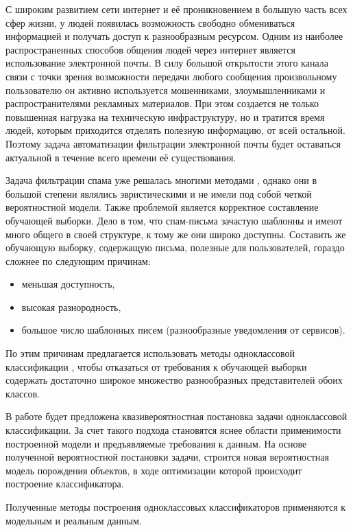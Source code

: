 С широким развитием сети интернет и её проникновением в большую часть всех сфер жизни, у людей появилась возможность свободно обмениваться информацией и получать доступ к разнообразным ресурсом. 
Одним из наиболее распространенных способов общения людей через интернет является использование электронной почты. 
В силу большой открытости этого канала связи с точки зрения возможности передачи любого сообщения произвольному пользователю он активно используется мошенниками, злоумышленниками и распространителями рекламных материалов. При этом создается не только повышенная нагрузка на техническую инфраструктуру, но и тратится время людей, которым приходится отделять полезную информацию, от всей остальной. 
Поэтому задача автоматизации фильтрации электронной почты будет оставаться актуальной в течение всего времени её существования.

Задача фильтрации спама уже решалась многими методами \cite{Islam2007, Sun2008}, однако они в большой степени являлись эвристическими и не имели под собой четкой вероятностной модели. 
Также проблемой является корректное составление обучающей выборки. 
Дело в том, что спам-письма зачастую шаблонны и имеют много общего в своей структуре, к тому же они широко доступны. 
Составить же обучающую выборку, содержащую письма, полезные для пользователей, гораздо сложнее по следующим причинам:
\begin{itemize}
	\item меньшая доступность,
	\item высокая разнородность,
	\item большое число шаблонных писем (разнообразные уведомления от сервисов).
\end{itemize}
По этим причинам предлагается использовать методы одноклассовой классификации \cite{Tax2001, Khan2006}, чтобы отказаться от требования к обучающей выборки содержать достаточно широкое множество разнообразных представителей обоих классов.

В работе будет предложена квазивероятностная постановка задачи одноклассовой классификации. 
За счет такого подхода становятся яснее области применимости построенной модели и предъявляемые требования к данным.
На основе полученной вероятностной постановки задачи, строится новая вероятностная модель порождения объектов, в ходе оптимизации которой происходит построение классификатора. %

Полученные методы построения одноклассовых классификаторов применяются к модельным и реальным данным.
